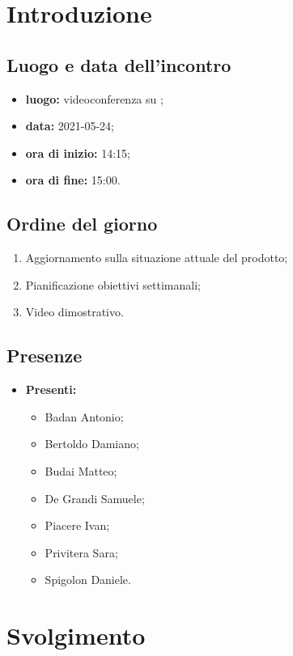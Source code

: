 \section*{Introduzione}
\subsection*{Luogo e data dell'incontro}
\begin{itemize}
	\item \textbf{luogo:} videoconferenza su ;
	\item \textbf{data:} 2021-05-24;
	\item \textbf{ora di inizio:} 14:15;
	\item \textbf{ora di fine:} 15:00.
\end{itemize}

\subsection*{Ordine del giorno}
\begin{enumerate}
	\item Aggiornamento sulla situazione attuale del prodotto;
	\item Pianificazione obiettivi settimanali;
	\item Video dimostrativo.
\end{enumerate}

\subsection*{Presenze}
\begin{itemize}
	\item \textbf{Presenti:}
	\begin{itemize}
		\item Badan Antonio;
		\item Bertoldo Damiano;
		\item Budai Matteo;
		\item De Grandi Samuele;
		\item Piacere Ivan;
		\item Privitera Sara;
		\item Spigolon Daniele.
	\end{itemize}
\end{itemize}

\section*{Svolgimento}
